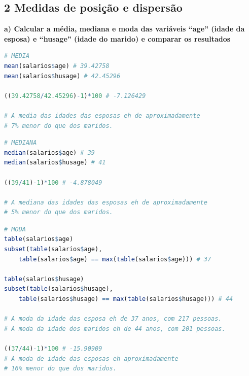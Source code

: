 \subsection*{\textbf{2 Medidas de posição e dispersão}}

\begin{adjustwidth}{1em}{}
\textbf{a) Calcular a média, mediana e moda das variáveis “age” (idade da esposa) e “husage” (idade do marido) e
comparar os resultados}
\end{adjustwidth}
\begin{lstlisting}[language=R, style=input] 
# MEDIA
mean(salarios$age) # 39.42758
mean(salarios$husage) # 42.45296

((39.42758/42.45296)-1)*100 # -7.126429

# A media das idades das esposas eh de aproximadamente 
# 7% menor do que dos maridos.
\end{lstlisting}
\begin{lstlisting}[language=R, style=input] 
# MEDIANA
median(salarios$age) # 39
median(salarios$husage) # 41

((39/41)-1)*100 # -4.878049

# A mediana das idades das esposas eh de aproximadamente 
# 5% menor do que dos maridos.
\end{lstlisting}
\begin{lstlisting}[language=R, style=input] 
# MODA
table(salarios$age)
subset(table(salarios$age), 
    table(salarios$age) == max(table(salarios$age))) # 37

table(salarios$husage)
subset(table(salarios$husage), 
    table(salarios$husage) == max(table(salarios$husage))) # 44

# A moda da idade das esposa eh de 37 anos, com 217 pessoas.
# A moda da idade dos maridos eh de 44 anos, com 201 pessoas.

((37/44)-1)*100 # -15.90909
# A moda de idade das esposas eh aproximadamente 
# 16% menor do que dos maridos.
\end{lstlisting}

